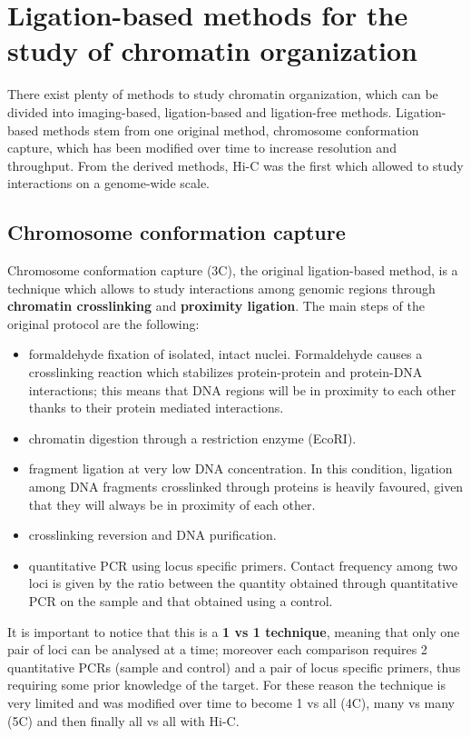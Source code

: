 \newpage
\section{Ligation-based methods for the study of chromatin organization}

There exist plenty of methods to study chromatin organization, which can be divided into imaging-based, ligation-based and ligation-free methods. Ligation-based methods stem from one original method, chromosome conformation capture, which has been modified over time to increase resolution and throughput. From the derived methods, Hi-C was the first which allowed to study interactions on a genome-wide scale.

\subsection{Chromosome conformation capture}
Chromosome conformation capture (3C), the original ligation-based method, is a technique which allows to study interactions among genomic regions through \textbf{chromatin crosslinking} and \textbf{proximity ligation}\cite{3coriginal2002}. The main steps of the original protocol are the following:
\begin{itemize}\tightlist
  \item formaldehyde fixation of isolated, intact nuclei. Formaldehyde causes a crosslinking reaction which stabilizes protein-protein and protein-DNA interactions; this means that DNA regions will be in proximity to each other thanks to their protein mediated interactions. 
  \item chromatin digestion through a restriction enzyme (EcoRI).
  \item fragment ligation at very low DNA concentration. In this condition, ligation among DNA fragments crosslinked through proteins is heavily favoured, given that they will always be in proximity of each other.
  \item crosslinking reversion and DNA purification.
  \item quantitative PCR using locus specific primers. Contact frequency among two loci is given by the ratio between the quantity obtained through quantitative PCR on the sample and that obtained using a control.
\end{itemize}
It is important to notice that this is a \textbf{1 vs 1 technique}, meaning that only one pair of loci can be analysed at a time; moreover each comparison requires 2 quantitative PCRs (sample and control) and a pair of locus specific primers, thus requiring some prior knowledge of the target. For these reason the technique is very limited and was modified over time to become 1 vs all (4C\cite{4cprotocol2006}), many vs many (5C\cite{5cprotocol2006}) and then finally all vs all with Hi-C.



